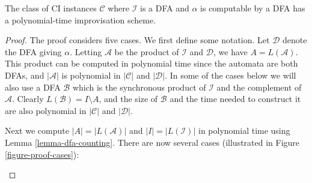 \documentclass[a4paper,USenglish,numberwithinsect]{lipics}
\theoremstyle{plain}
\theoremstyle{definition}
\newcommand{\improvs}{I}
\newcommand{\valids}{A}
\begin{document}
\begin{theorem} \label{theorem-dfa-scheme}
The class of CI instances $\mathcal{C}$ where $\mathcal{\improvs}$ is
a DFA and $\alpha$ is computable by a DFA has a polynomial-time
improvisation scheme.  
\end{theorem}
\begin{proof}
The proof considers five cases. We first define some notation. 
Let $\mathcal{D}$ denote the DFA giving $\alpha$. Letting
$\mathcal{\valids}$ be the product of $\mathcal{\improvs}$
and $\mathcal{D}$, we have $\valids = L(\mathcal{\valids})$. This
product can be computed in polynomial time since the automata are both
DFAs, and $|\mathcal{\valids}|$ is polynomial in $|\mathcal{C}|$ and
$|\mathcal{D}|$. In some of the cases below we will also use a DFA
$\mathcal{B}$ which is the synchronous product of $\mathcal{\improvs}$
and the complement of $\mathcal{\valids}$. Clearly $L(\mathcal{B}) =
\improvs \setminus \valids$, and the size of $\mathcal{B}$ and the
time needed to construct it are also polynomial in $|\mathcal{C}|$ and
$|\mathcal{D}|$. 

Next we compute $|\valids| = |L(\mathcal{\valids})|$ and $| \improvs |
= |L(\mathcal{\improvs})|$ in polynomial time using Lemma
\ref{lemma-dfa-counting}. There are now several cases (illustrated in Figure
\ref{figure-proof-cases}): 

{
\setlength{\intextsep}{8pt}
\setlength{\belowcaptionskip}{-5pt}
\setlength{\abovecaptionskip}{2pt}
\begin{figure}
\centering
{}
\end{figure}}
\end{proof}
\end{document}

